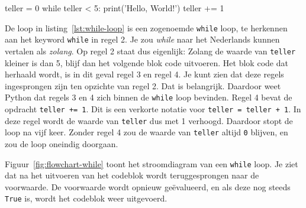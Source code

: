 \documentclass[../main]{subfiles}
\begin{document}
\begin{python}[style=mu, caption={Een \texttt{while} loop}, label={lst:while-loop}]
teller = 0
while teller < 5:
    print('Hello, World!')
    teller += 1
\end{python}

\begin{center}
%
\label{fig:while-loop-resultaat}
\end{center}

De loop in listing~\ref{lst:while-loop} is een zogenoemde \texttt{while} loop, te herkennen aan het keyword \texttt{while} in regel 2. Je zou \emph{while} naar het Nederlands kunnen vertalen als \emph{zolang}. Op regel 2 staat dus eigenlijk: Zolang de waarde van \texttt{teller} kleiner is dan 5, blijf dan het volgende blok code uitvoeren. Het blok code dat herhaald wordt, is in dit geval regel 3 en regel 4. Je kunt zien dat deze regels ingesprongen zijn ten opzichte van regel 2. Dat is belangrijk. Daardoor weet Python dat regels 3 en 4 zich binnen de \texttt{while} loop bevinden. 
Regel 4 bevat de opdracht \texttt{teller += 1}. Dit is een verkorte notatie voor \texttt{teller = teller + 1}. In deze regel wordt de waarde van \texttt{teller} dus met 1 verhoogd. Daardoor stopt de loop na vijf keer. Zonder regel 4 zou de waarde van \texttt{teller} altijd \texttt{0} blijven, en zou de loop oneindig doorgaan.

\clearpage
Figuur~\ref{fig:flowchart-while} toont het stroomdiagram van een \texttt{while} loop. Je ziet dat na het uitvoeren van het codeblok wordt teruggesprongen naar de voorwaarde. De voorwaarde wordt opnieuw geëvalueerd, en als deze nog steeds \texttt{True} is, wordt het codeblok weer uitgevoerd. 
\end{document}

